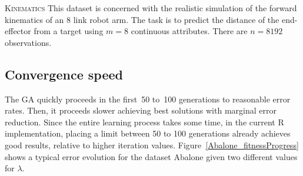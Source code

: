 \documentclass[final,authoryear,3p,times,twocolumn]{elsarticle}
\begin{document}
\begin{description}

\item{\textsc{Kinematics}} This dataset is concerned with the realistic simulation of the forward kinematics of an 8 link robot arm. The task is to predict the distance of the end-effector from a target using $m=8$ continuous attributes. There are $n=8192$ observations. 


\end{description}

\subsection{Convergence speed}

The \ac{GA} quickly proceeds in the first~50 to~100 generations to reasonable error rates. Then, it proceeds slower achieving best solutions with marginal error reduction. Since the entire learning process takes some time, in the current R implementation, placing a limit between 50 to 100 generations already achieves good results, relative to higher iteration values. Figure~\ref{Abalone_fitnessProgress} shows a typical error evolution for the dataset Abalone given two different values for $\lambda$.

\begin{figure*}[tb]
\begin{center}
\caption{Error progress for Abalone dataset during a single execution of the genetic algorithm. The figure shows the fitness evolution for two different regularization values. The population for both consisted of $200$ polynomials. The error values seem to stabilize around iteration~250.}
\label{Abalone_fitnessProgress}

\end{center}
\end{figure*}
\end{document}
